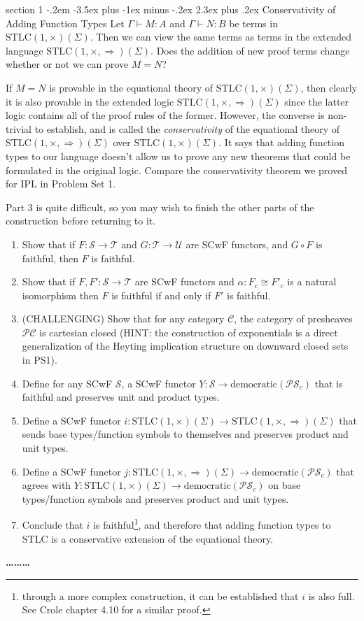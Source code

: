 \documentclass[12pt]{article}
\makeatletter
\newenvironment{problem}{\@startsection
       {section}
       {1}
       {-.2em}
       {-3.5ex plus -1ex minus -.2ex}
       {2.3ex plus .2ex}
       {\pagebreak[3]%
       \large\bf\noindent{Problem }
       }
       }
       {%
       \begin{center}\large\bf \ldots\ldots\ldots\end{center}}
\newcommand{\cat}{\mathcal}
\newcommand{\stlccart}{\mathrm{STLC}(1,\times)}
\newcommand{\stlcccc}{\mathrm{STLC}(1,\times,\Rightarrow)}
\makeatother
\begin{document}
\begin{problem}{Conservativity of Adding Function Types}
  Let $\Gamma \vdash M : A$ and $\Gamma \vdash N : B$ be terms in
  $\stlccart(\Sigma)$. Then we can view the same terms as terms
  in the extended language $\stlcccc(\Sigma)$. Does
  the addition of new proof terms change whether or not we can prove
  $M = N$?

  If $M = N$ is provable in the equational theory of
  $\stlccart(\Sigma)$, then clearly it is also provable in the
  extended logic $\stlcccc(\Sigma)$ since the latter logic contains
  all of the proof rules of the former. However, the converse is
  non-trivial to establish, and is called the \emph{conservativity} of
  the equational theory of $\stlcccc(\Sigma)$ over
  $\stlccart(\Sigma)$. It says that adding function types to our
  language doesn't allow us to prove any new theorems that could be
  formulated in the original logic. Compare the conservativity theorem
  we proved for IPL in Problem Set 1.

  Part 3 is quite difficult, so you may wish to finish the other parts
  of the construction before returning to it.
  \begin{enumerate}
  \item Show that if $F : \cat S \to \cat T$ and $G : \cat T \to \cat
    U$ are SCwF functors, and $G \circ F$ is faithful, then $F$ is
    faithful.
  \item Show that if $F, F' : \cat S \to \cat T$ are SCwF functors and
    $\alpha : F_c \cong F'_c$ is a natural isomorphism then $F$ is
    faithful if and only if $F'$ is faithful.
  \item (CHALLENGING) Show that for any category $\cat C$, the category of
    presheaves $\mathcal P\cat C$ is cartesian closed (HINT: the
    construction of exponentials is a direct generalization of the
    Heyting implication structure on downward closed sets in PS1).
  \item Define for any SCwF $\cat S$, a SCwF functor $Y : \cat S \to
    \textrm{democratic}(\mathcal P\cat {S}_c)$ that is faithful and
    preserves unit and product types.
  \item Define a SCwF functor $i : \stlccart(\Sigma) \to
    \stlcccc(\Sigma)$ that sends base types/function symbols to
    themselves and preserves product and unit types.
  \item Define a SCwF functor $j : \stlcccc(\Sigma) \to
    \textrm{democratic}(\mathcal P\cat {S}_c)$ that agrees with $Y :
    \stlccart(\Sigma) \to \textrm{democratic}(\mathcal P\cat {S}_c)$
    on base types/function symbols and preserves product and unit
    types.

  \item Conclude that $i$ is faithful\footnote{through a more complex
  construction, it can be established that $i$ is also full. See Crole
  chapter 4.10 for a similar proof.}, and therefore that adding
    function types to STLC is a conservative extension of the
    equational theory.
  \end{enumerate}
\end{problem}
\end{document}

